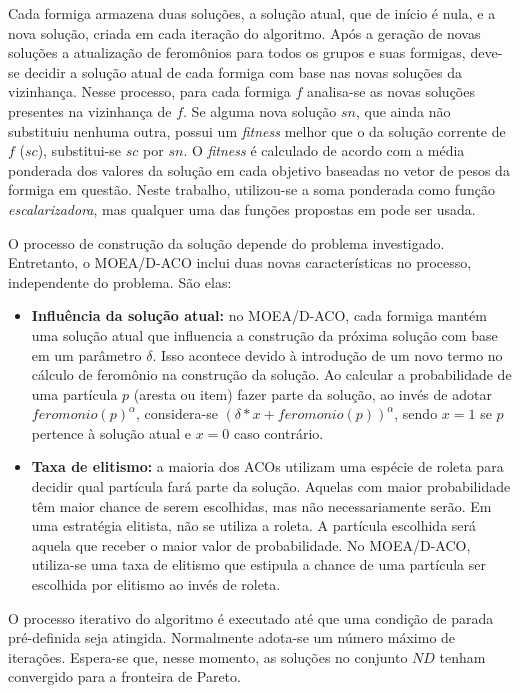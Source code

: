 Cada formiga armazena duas soluções, a solução atual, que de início é nula, e a nova solução, criada em cada iteração do algoritmo. Após a geração de novas soluções a atualização de feromônios para todos os grupos e suas formigas, deve-se decidir a solução atual de cada formiga com base nas novas soluções da vizinhança. Nesse processo, para cada formiga $f$ analisa-se as novas soluções presentes na vizinhança de $f$. Se alguma nova solução $sn$, que ainda não substituiu nenhuma outra, possui um \textit{fitness} melhor que o da solução corrente de $f$ ($sc$), substitui-se $sc$ por $sn$. O \textit{fitness} é calculado de acordo com a média ponderada dos valores da solução em cada objetivo baseadas no vetor de pesos da formiga em questão. Neste trabalho, utilizou-se a soma ponderada como função \textit{escalarizadora}, mas qualquer uma das funções propostas em \cite{Zhang2007} pode ser usada.

O processo de construção da solução depende do problema investigado. Entretanto, o MOEA/D-ACO inclui duas novas características no processo, independente do problema. São elas:

\begin{itemize}
	\item \textbf{Influência da solução atual:} no MOEA/D-ACO, cada formiga mantém uma solução atual que influencia a construção da próxima solução com base em um parâmetro $\delta$. Isso acontece devido à introdução de um novo termo no cálculo de feromônio na construção da solução. Ao calcular a probabilidade de uma partícula $p$ (aresta ou item) fazer parte da solução, ao invés de adotar $feromonio(p)^\alpha$, considera-se $(\delta * x + feromonio(p))^\alpha$, sendo $x = 1$ se $p$ pertence à solução atual e $x = 0$ caso contrário.
	\item \textbf{Taxa de elitismo:} a maioria dos ACOs utilizam uma espécie de roleta para decidir qual partícula fará parte da solução. Aquelas com maior probabilidade têm maior chance de serem escolhidas, mas não necessariamente serão. Em uma estratégia elitista, não se utiliza a roleta. A partícula escolhida será aquela que receber o maior valor de probabilidade. No MOEA/D-ACO, utiliza-se uma taxa de elitismo que estipula a chance de uma partícula ser escolhida por elitismo ao invés de roleta.
\end{itemize}

O processo iterativo do algoritmo é executado até que uma condição de parada pré-definida seja atingida. Normalmente adota-se um número máximo de iterações. Espera-se que, nesse momento, as soluções no conjunto $ND$ tenham convergido para a fronteira de Pareto.

